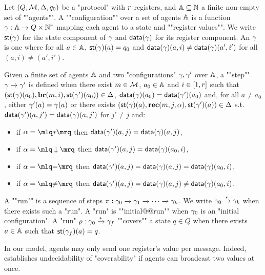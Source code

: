 \begin{definition}[Semantics]
	Let $(Q,\mathcal{M}, \Delta, q_0)$ be a "protocol" with $r$ registers, and $\mathbb{A} \subseteq \mathbb{N}$ a finite non-empty set of ""agents"".
	A ""configuration"" over a set of agents $\mathbb{A}$ is a function $\gamma : \mathbb{A} \to Q \times \mathbb{N}^{r}$ mapping each agent to a state and ""register values"". 
	We write $\mathsf{st}(\gamma)$ for the state component of $\gamma$ and $\mathsf{data}(\gamma)$ for its register component.
	An  $\gamma$ is one where for all $a \in \mathbb{A}$, $\mathsf{st}(\gamma)(a) = q_0$ and $\mathsf{data}(\gamma)(a, i) \neq \mathsf{data}(\gamma)(a', i')$ for all $(a,i) \neq (a', i')$.
	
	\AP Given a finite set of agents $\mathbb{A}$ and two "configurations" $\gamma, \gamma'$ over $\mathbb{A}$, a ""step"" $\gamma \xrightarrow{} \gamma'$ is defined when there exist $m \in \mathcal{M}$, $a_0 \in \mathbb{A}$ and $i \in [1,r]$ such that \linebreak $(\mathsf{st}(\gamma)(a_0),\textbf{br}(m, i), \mathsf{st}(\gamma')(a_0)) \in \Delta$, $\mathsf{data}(\gamma)(a_0) = \mathsf{data}(\gamma')(a_0)$ and, for all $a \ne a_0$, either $\gamma'(a) = \gamma(a)$ or there exists $(\mathsf{st}(\gamma)(a),\textbf{rec}(m, j, \alpha),\mathsf{st}(\gamma')(a)) \in \Delta$
		s.t. $\mathsf{data}(\gamma')(a, j') = \mathsf{data}(\gamma)(a, j')$ for $j' \neq j$ and:
		\begin{itemize}
				\item if $\anact = \quotemarks{\dummyact}$ 
				then $\mathsf{data}(\gamma')(a,j) = \mathsf{data}(\gamma)(a,j)$,
				\item if $\anact = \quotemarks{\enregact}$ then $\mathsf{data}(\gamma')(a,j) = \mathsf{data}(\gamma)(a_0,i)$,
				\item if $\anact = \quotemarks{\eqtestact}$ then $\mathsf{data}(\gamma')(a,j) = \mathsf{data}(\gamma)(a,j) =\mathsf{data}(\gamma)(a_0,i)$,
				\item if $\anact = \quotemarks{\diseqtestact}$ then $\mathsf{data}(\gamma')(a,j) = \mathsf{data}(\gamma)(a,j) \ne \mathsf{data}(\gamma)(a_0,i)$.
			\end{itemize}
	
	\AP A ""run"" is a sequence of steps $\pi : \gamma_0 \xrightarrow{} \gamma_1 \xrightarrow{} \cdots \xrightarrow{} \gamma_k$. 
	We write $\gamma_0 \xrightarrow{*} \gamma_k$ when there exists such a "run".
	A "run" is ""initial@@run"" when $\gamma_0$ is an "initial configuration".  
	A "run" $\rho: \gamma_0 \xrightarrow{*} \gamma_f$ ""covers"" a state $q \in Q$ when there exists $a \in \mathbb{A}$ such that $\mathsf{st}(\gamma_f)(a) = q$. 
\end{definition}
\begin{remark}
\label{rem:several_values_per_message}
In our model, agents may only send one register's value per message. Indeed, \cite{DelzannoST13} establishes undecidability of "coverability" if agents can broadcast two values at once.
\end{remark}

